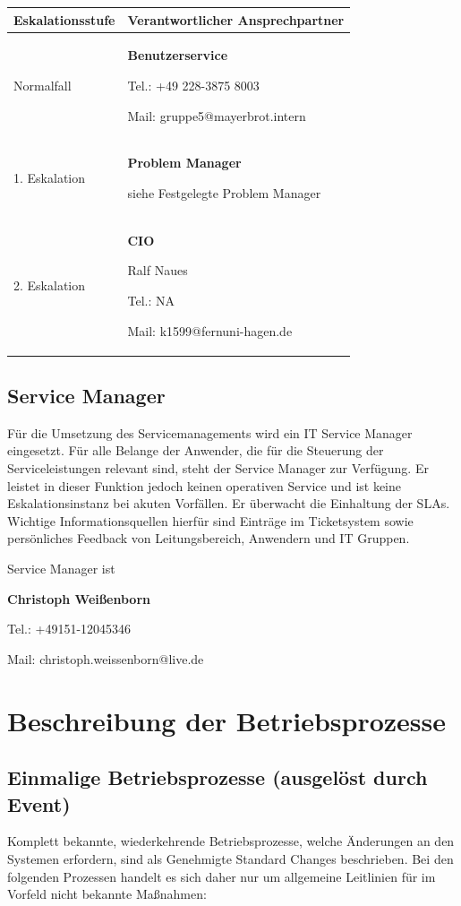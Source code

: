 \documentclass[]{article}
\begin{document}
\begin{longtable}{lp{6cm}}
\toprule
Eskalationsstufe & Verantwortlicher Ansprechpartner\tabularnewline
\midrule
\endhead
Normalfall & \textbf{Benutzerservice}

Tel.: +49 228-3875 8003

Mail: gruppe5@mayerbrot.intern\tabularnewline
1. Eskalation & \textbf{Problem Manager}

siehe Festgelegte Problem Manager\tabularnewline
2. Eskalation & \textbf{CIO}

Ralf Naues

Tel.: NA

Mail: k1599@fernuni-hagen.de\tabularnewline
\bottomrule
\end{longtable}

\subsection{Service Manager}\label{service-manager}

Für die Umsetzung des Servicemanagements wird ein IT Service Manager
eingesetzt. Für alle Belange der Anwender, die für die Steuerung der
Serviceleistungen relevant sind, steht der Service Manager zur
Verfügung. Er leistet in dieser Funktion jedoch keinen operativen
Service und ist keine Eskalationsinstanz bei akuten Vorfällen. Er
überwacht die Einhaltung der SLAs. Wichtige Informationsquellen hierfür
sind Einträge im Ticketsystem sowie persönliches Feedback von
Leitungsbereich, Anwendern und IT Gruppen.

Service Manager ist

\textbf{Christoph Weißenborn}

Tel.: +49151-12045346

Mail: christoph.weissenborn@live.de

\section{Beschreibung der
Betriebsprozesse}\label{beschreibung-der-betriebsprozesse}

\subsection{Einmalige Betriebsprozesse (ausgelöst durch
Event)}\label{einmalige-betriebsprozesse-ausgeluxf6st-durch-event}

Komplett bekannte, wiederkehrende Betriebsprozesse, welche Änderungen an
den Systemen erfordern, sind als Genehmigte Standard Changes
beschrieben. Bei den folgenden Prozessen handelt es sich daher nur um
allgemeine Leitlinien für im Vorfeld nicht bekannte Maßnahmen:
\end{document}
